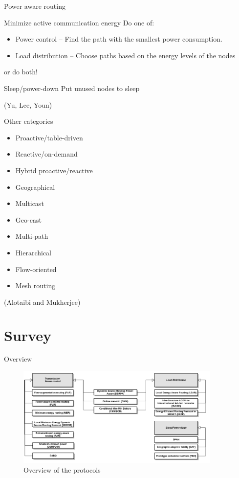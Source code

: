 \documentclass{beamer}
\begin{document}
\begin{frame}{Power aware routing}
\begin{block}{Minimize active communication energy}
    Do one of:
    \begin{itemize}
        \item Power control -- Find the path with the smallest power consumption.
        \item Load distribution -- Choose paths based on the energy levels of the nodes
    \end{itemize}
    or do both!
\end{block}
\begin{block}{Sleep/power-down}
    Put unused nodes to sleep
\end{block}
(Yu, Lee, Youn\cite{main1})
\end{frame}
\begin{frame}{Other categories}
\begin{itemize}
    \item Proactive/table-driven
    \item Reactive/on-demand
    \item Hybrid proactive/reactive
    \item Geographical
    \item Multicast
    \item Geo-cast
    \item Multi-path
    \item Hierarchical
    \item Flow-oriented
    \item Mesh routing
\end{itemize}
    (Alotaibi and Mukherjee\cite{alotaibi2012survey})
\end{frame}

\section{Survey}
\frame{\tableofcontents[currentsection]}
\begin{frame}{Overview}
\begin{figure}
  \centering
  \includegraphics[width=0.9\textwidth]{images/overview}
  \caption{Overview of the protocols}
  
\end{figure}
\end{frame}
\end{document}

